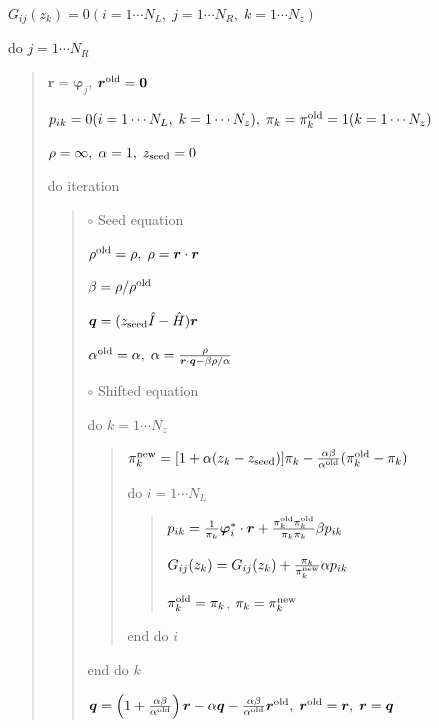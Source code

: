 \documentclass[letterpaper,10pt,dvipdfmx,openany]{sphinxmanual}
\begin{document}
\(G_{i j}(z_k) = 0 (i=1 \cdots N_L,\; j = 1 \cdots N_R,\; k=1 \cdots N_z)\)

do \(j = 1 \cdots N_R\)
\begin{quote}

\({\boldsymbol r} = {\boldsymbol \varphi_j}\), \({\boldsymbol r}^{\rm old} = {\bf 0}\)

\(p_{i k} = 0(i=1 \cdots N_L,\; k=1 \cdots N_z),\; \pi_k=\pi_k^{\rm old} = 1(k=1 \cdots N_z)\)

\(\rho = \infty,\; \alpha = 1,\; z_{\rm seed}=0\)

do iteration
\begin{quote}

\(\circ\) Seed equation

\(\rho^{\rm old} = \rho,\; \rho = {\boldsymbol r} \cdot {\boldsymbol r}\)

\(\beta = \rho / \rho^{\rm old}\)

\({\boldsymbol q} = (z_{\rm seed} {\hat I} - {\hat H}){\boldsymbol r}\)

\(\alpha^{\rm old} = \alpha,\; \alpha = \frac{\rho}{{\boldsymbol r}\cdot{\boldsymbol q} - \beta \rho / \alpha }\)

\(\circ\) Shifted equation

do \(k = 1 \cdots N_z\)
\begin{quote}

\(\pi_k^{\rm new} = [1+\alpha(z_k-z_{\rm seed})]\pi_k - \frac{\alpha \beta}{\alpha^{\rm old}}(\pi_k^{\rm old} - \pi_k)\)

do \(i = 1 \cdots N_L\)
\begin{quote}

\(p_{i k} = \frac{1}{\pi_k} {\boldsymbol \varphi}_i^* \cdot {\boldsymbol r} + \frac{\pi^{\rm old}_k \pi^{\rm old}_k}{\pi_k \pi_k} \beta p_{i k}\)

\(G_{i j}(z_k) = G_{i j}(z_k) + \frac{\pi_k}{\pi_k^{\rm new}} \alpha p_{i k}\)

\(\pi_k^{\rm old} = \pi_k\), \(\pi_k = \pi_k^{\rm new}\)
\end{quote}

end do \(i\)
\end{quote}

end do \(k\)

\({\boldsymbol q} = \left( 1 + \frac{\alpha \beta}{\alpha^{\rm old}} \right) {\boldsymbol r} - \alpha {\boldsymbol q} - \frac{\alpha \beta}{\alpha^{\rm old}} {\boldsymbol r}^{\rm old},\; {\boldsymbol r}^{\rm old} = {\boldsymbol r},\; {\boldsymbol r} = {\boldsymbol q}\)


\end{quote}
\end{quote}
\end{document}
